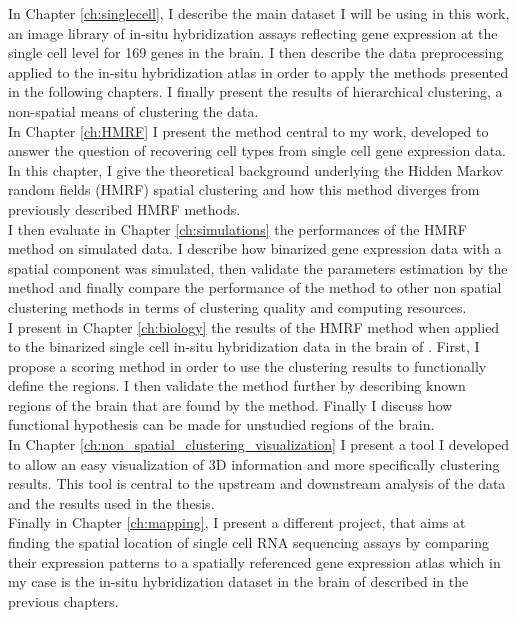 	In Chapter \ref{ch:singlecell}, I describe the main dataset I will be using in this work, an image library of in-situ hybridization assays reflecting gene expression at the single cell level for 169 genes in the brain. I then describe the data preprocessing applied to the in-situ hybridization atlas in order to apply the methods presented in the following chapters. I finally present the results of hierarchical clustering, a non-spatial means of clustering the data.\\
	
	In Chapter \ref{ch:HMRF} I  present the method central to my work, developed to answer the question of recovering cell types from single cell gene expression data. In this chapter, I give the theoretical background underlying the Hidden Markov random fields (HMRF) spatial clustering and how this method diverges from previously described HMRF methods. \\
	
	I then evaluate in Chapter \ref{ch:simulations} the performances of the HMRF method on simulated data. I describe how binarized gene expression data with a spatial component was simulated, then validate the parameters estimation by the method and finally compare the performance of the method to other non spatial clustering methods in terms of clustering quality and computing resources.\\
	
	I present in Chapter \ref{ch:biology} the results of the HMRF method when applied to the binarized single cell in-situ hybridization data in the brain of \platyfull{}. First, I propose a scoring method in order to use the clustering results to functionally define the regions. I then validate the method further by describing known regions of the brain that are found by the method. Finally I discuss how functional hypothesis can be made for unstudied regions of the brain.\\
	
	In Chapter \ref{ch:non_spatial_clustering_visualization} I present a tool I developed to allow an easy visualization of 3D information and more specifically clustering results. This tool is central to the upstream and downstream analysis of the data and the results used in the thesis.\\
	
	Finally in Chapter \ref{ch:mapping}, I present a different project, that aims at finding the spatial location of single cell RNA sequencing assays by comparing their expression patterns to a spatially referenced gene expression atlas which in my case is the in-situ hybridization dataset in the brain of \platyfull{} described in the previous chapters.
	
	
	
	

%
%
%
%
%



